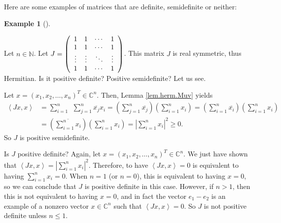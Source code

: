 \documentclass[numbers=enddot,12pt,final,onecolumn,notitlepage]{scrartcl}%
\numberwithin{exer}{subsection}
\theoremstyle{definition}
\newtheorem{exam}[theo]{Example}
\newenvironment{example}[1][]
{\begin{exam}[#1]\begin{leftbar}}
{\end{leftbar}\end{exam}}
\let\sumnonlimits\sum
\renewcommand{\sum}{\sumnonlimits\limits}
\begin{document}
Here are some examples of matrices that are definite, semidefinite or neither:

\begin{example}
Let $n\in\mathbb{N}$. Let $J=\left(
\begin{array}
[c]{cccc}%
1 & 1 & \cdots & 1\\
1 & 1 & \cdots & 1\\
\vdots & \vdots & \ddots & \vdots\\
1 & 1 & \cdots & 1
\end{array}
\right)  $. This matrix $J$ is real symmetric, thus Hermitian. Is it positive
definite? Positive semidefinite? Let us see.

Let $x=\left(  x_{1},x_{2},\ldots,x_{n}\right)  ^{T}\in\mathbb{C}^{n}$. Then,
Lemma \ref{lem.herm.Muv} yields%
\begin{align*}
\left\langle Jx,x\right\rangle  &  =\sum_{i=1}^{n}\ \ \sum_{j=1}^{n}%
\overline{x_{j}}x_{i}=\left(  \sum_{j=1}^{n}\overline{x_{j}}\right)  \left(
\sum_{i=1}^{n}x_{i}\right)  =\left(  \sum_{i=1}^{n}\overline{x_{i}}\right)
\left(  \sum_{i=1}^{n}x_{i}\right) \\
&  =\left(  \overline{\sum_{i=1}^{n}x_{i}}\right)  \left(  \sum_{i=1}^{n}%
x_{i}\right)  =\left\vert \sum_{i=1}^{n}x_{i}\right\vert ^{2}\geq0.
\end{align*}
So $J$ is positive semidefinite.

Is $J$ positive definite? Again, let $x=\left(  x_{1},x_{2},\ldots
,x_{n}\right)  ^{T}\in\mathbb{C}^{n}$. We just have shown that $\left\langle
Jx,x\right\rangle =\left\vert \sum_{i=1}^{n}x_{i}\right\vert ^{2}$. Therefore,
to have $\left\langle Jx,x\right\rangle =0$ is equivalent to having
$\sum_{i=1}^{n}x_{i}=0$. When $n=1$ (or $n=0$), this is equivalent to having
$x=0$, so we can conclude that $J$ is positive definite in this case. However,
if $n>1$, then this is not equivalent to having $x=0$, and in fact the vector
$e_{1}-e_{2}$ is an example of a nonzero vector $x\in\mathbb{C}^{n}$ such that
$\left\langle Jx,x\right\rangle =0$. So $J$ is not positive definite unless
$n\leq1$.
\end{example}
\end{document}
